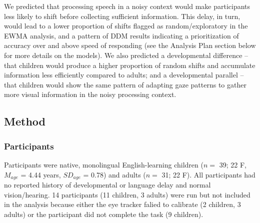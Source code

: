 \documentclass[10pt, letterpaper]{article}
\begin{document}
We predicted that processing speech in a noisy context would make
participants less likely to shift before collecting sufficient
information. This delay, in turn, would lead to a lower proportion of
shifts flagged as random/exploratory in the EWMA analysis, and a pattern
of DDM results indicating a prioritization of accuracy over and above
speed of responding (see the Analysis Plan section below for more
details on the models). We also predicted a developmental difference --
that children would produce a higher proportion of random shifts and
accumulate information less efficiently compared to adults; and a
developmental parallel -- that children would show the same pattern of
adapting gaze patterns to gather more visual information in the noisy
processing context.

\hypertarget{method}{%
\subsection{Method}\label{method}}

\hypertarget{participants}{%
\subsubsection{Participants}\label{participants}}

Participants were native, monolingual English-learning children (\(n=\)
39; 22 F, \(M_{age}\) = 4.44 years, \(SD_{age}\) = 0.78) and adults
(\(n=\) 31; 22 F). All participants had no reported history of
developmental or language delay and normal vision/hearing. 14
participants (11 children, 3 adults) were run but not included in the
analysis because either the eye tracker falied to calibrate (2 children,
3 adults) or the participant did not complete the task (9 children).
\end{document}
